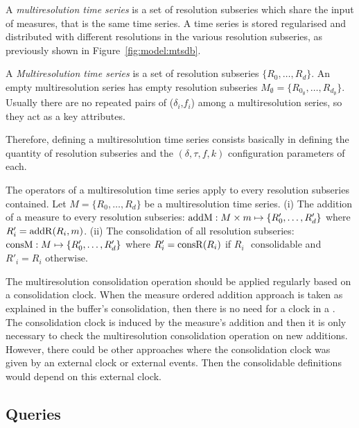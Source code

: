 A \emph{multiresolution time series} is a set of resolution subseries
which share the input of measures, that is the same time series. A
time series is stored regularised and distributed with different
resolutions in the various resolution subseries, as previously shown
in Figure~\ref{fig:model:mtsdb}.
\begin{definition}%
  A \emph{Mul\-ti\-re\-solution time series} is a set of resolution
  subseries $\{R_0, \dots, R_d\}$.  An empty multiresolution series
  has empty resolution subseries $M_{\emptyset}=\{R_{0_\emptyset},
  \dots, R_{d_\emptyset}\}$. Usually there are no repeated pairs of
  ($\delta_i$,$f_i$) among a multiresolution series, so they act as a
  key attributes.
\end{definition}

Therefore, defining a multiresolution time series consists basically
in defining the quantity of resolution subseries and the
$(\delta,\tau,f,k)$ configuration parameters of each.


The operators of a multiresolution time series apply to every
resolution subseries contained. Let $M=\{R_0,\allowbreak
\dots,\allowbreak R_d\}$ be a multiresolution time series.  (i) The
addition of a measure to every resolution subseries: $\operatorname{addM} : M \times
m \mapsto \{R'_0, \dots,\allowbreak R'_d\}$ where
$R'_i=\operatorname{addR}(R_i,m)$. (ii) The consolidation of all resolution
subseries: $\operatorname{consM} : M \mapsto \{R'_0,\allowbreak \dots,\allowbreak
R'_d\}$ where $R'_i = \operatorname{consR}(R_i)$ if $R_i$ $\text{ consolidable}$ and
$R'_i=R_i$ $\text{otherwise}$.


The multiresolution consolidation operation should be applied
regularly based on a consolidation clock. When the measure ordered
addition approach is taken as explained in the buffer's consolidation,
then there is no need for a clock in a . The consolidation clock
is induced by the measure's addition and then it is only necessary to
check the multiresolution consolidation operation on new
additions. However, there could be other approaches where the
consolidation clock was given by an external clock or external
events. Then the consolidable definitions would depend on this
external clock.





\subsection{Queries}


